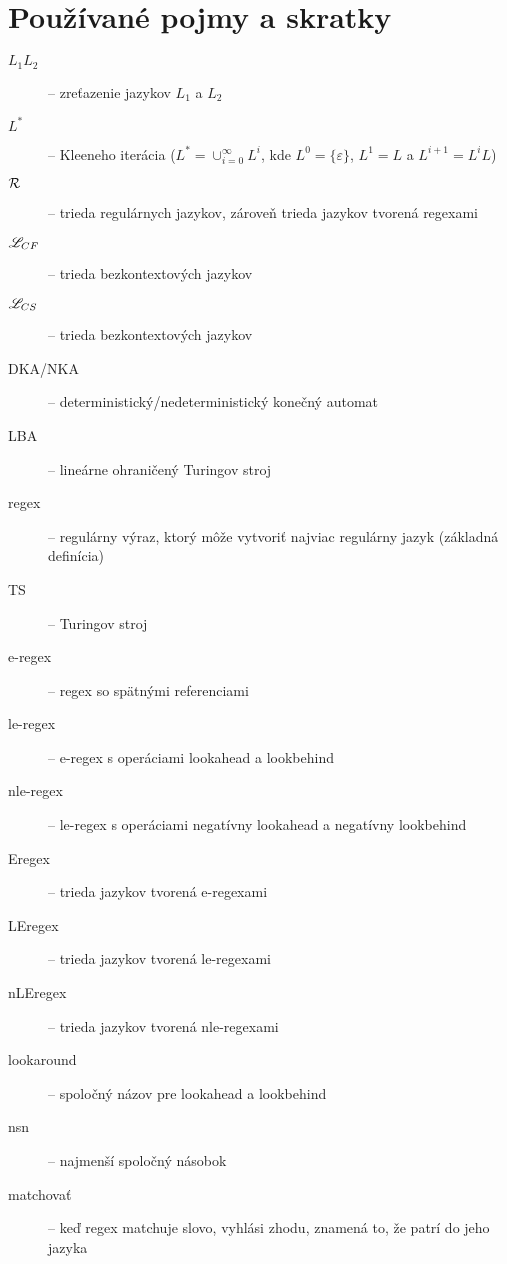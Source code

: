 \chapter*{Používané pojmy a skratky}
\label{chap:pojmy}

\begin{description}
\item[$ L_{1}L_{2} $] -- zreťazenie jazykov $ L_{1} $ a $ L_{2} $
\item[$ L^* $] -- Kleeneho iterácia ($L^*=\cup^{\infty}_{i=0}L^i$, kde $L^0=\lbrace \varepsilon \rbrace$, $L^1=L$ a $L^{i+1}=L^iL$)
\item[$ {\cal R} $] -- trieda regulárnych jazykov, zároveň trieda jazykov tvorená regexami
\item[$ \mathscr{L}_{CF}$] -- trieda bezkontextových jazykov
\item[$ \mathscr{L}_{CS}$] -- trieda bezkontextových jazykov
\item[DKA/NKA] -- deterministický/nedeterministický konečný automat
\item[LBA] -- lineárne ohraničený Turingov stroj
\item[regex] -- regulárny výraz, ktorý môže vytvoriť najviac regulárny jazyk (základná definícia)
\item[TS] -- Turingov stroj
\item[e-regex] -- regex so spätnými referenciami
\item[le-regex] -- e-regex s operáciami lookahead a lookbehind
\item[nle-regex] -- le-regex s operáciami negatívny lookahead a negatívny lookbehind
\item[Eregex] -- trieda jazykov tvorená e-regexami
\item[LEregex] -- trieda jazykov tvorená le-regexami
\item[nLEregex] -- trieda jazykov tvorená nle-regexami
\item[lookaround] -- spoločný názov pre lookahead a lookbehind
\item[nsn] -- najmenší spoločný násobok
\item[matchovať] -- keď regex matchuje slovo, vyhlási zhodu, znamená to, že patrí do jeho jazyka
\end{description}

